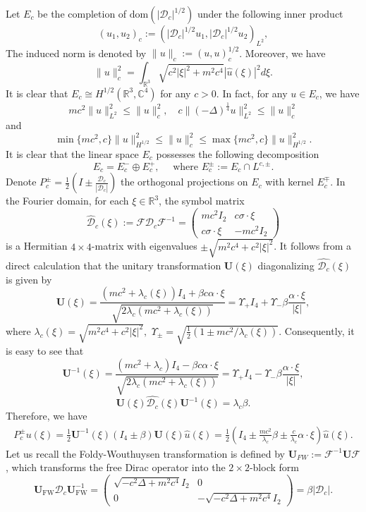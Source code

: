 \documentclass{amsart}
\theoremstyle{plain}
\theoremstyle{definition}
\theoremstyle{remark}
\numberwithin{equation}{section} \numberwithin{figure}{section}
\begin{document}
Let $E_c$ be the completion of $\text{dom}(|\mathscr{D}_c|^{1/2})$ under the following inner product
$$
(u_1,u_2)_c:= \left(|\mathscr{D}_c|^{1/2}u_1, |\mathscr{D}_c|^{1/2}u_2\right)_{L^2},
$$
The induced norm is denoted by $\| u\|_c:=(u,u)_c^{1/2}$. 
Moreover, we have
$$
\|u\|_c^2 = \int_{\mathbb{R}^3}\sqrt{c^2|\xi|^2 + m^2c^4}|\hat{u}(\xi)|^2 d\xi.
$$
It is clear that $E_c\cong H^{1/2}(\mathbb{R}^3,\mathbb{C}^{4})$ for any $c>0$. In fact, for any $u\in E_c$, we have 
$$
mc^2\|u\|_{L^2}^2\leq \| u\|_c^2, \quad c\|(-\Delta)^{\frac{1}{4}}u\|_{L^2}^2\leq \|u\|_c^2
$$
and
\[\min\{mc^2,c\}\|u\|_{H^{1/2}}^2  \leq  \| u\|_c^2\leq \max\{mc^2,c\}\|u\|_{H^{1/2}}^2 .\]
It is clear that the linear space $E_c$ possesses the following decomposition
$$
E_c=E_c^{-} \oplus E_c^{+}, \quad \text { where } E_c^{\pm}:=E_c \cap L^{c, \pm}.
$$
Denote $P_c^\pm=\frac{1}{2}\left(I \pm \frac{\mathscr{D}_c}{\left|\mathscr{D}_c\right|}\right)$ the orthogonal projections on $E_c$ with kernel $E_c^\mp$. 
In the Fourier domain, for each $\xi \in \mathbb{R}^3$, the symbol matrix
$$
\hat{\mathscr{D}}_c(\xi):=   \mathcal{F} \mathscr{D}_c \mathcal{F}^{-1} =\left(\begin{array}{cc}
m c^2 I_2 & c \sigma \cdot \xi \\
c \sigma \cdot \xi & -m c^2 I_2
\end{array}\right)
$$
  is a Hermitian $4\times 4$-matrix with eigenvalues
$\pm \sqrt{m^2 c^4+c^2|\xi|^2}$.
It follows from a direct calculation that the unitary transformation $\mathbf{U}(\xi)$  diagonalizing $\hat{\mathscr{D}_c}(\xi)$
is given  by
$$
\mathbf{U}(\xi)=\frac{\left(m c^2+\lambda_c(\xi)\right) I_4+\beta c \alpha \cdot \xi}{\sqrt{2 \lambda_c\left(m c^2+\lambda_c(\xi)\right)}}=\Upsilon_{+} I_4+\Upsilon_{-} \beta \frac{\alpha \cdot \xi}{|\xi|},
$$
where $\lambda_c(\xi)=\sqrt{m^2 c^4+c^2|\xi|^2}, $ $\Upsilon_{\pm}=\sqrt{\frac{1}{2}\left(1 \pm m c^2 / \lambda_c(\xi)\right)}$.
Consequently, it is easy to see that
$$
\mathbf{U}^{-1}(\xi)=\frac{\left(m c^2+\lambda_c\right) I_4-\beta c \alpha \cdot \xi}{\sqrt{2 \lambda_c\left(m c^2+\lambda_c(\xi)\right)}}=\Upsilon_{+} I_4-\Upsilon_{-} \beta \frac{\alpha \cdot \xi}{|\xi|},
$$
$$
\mathbf{U}(\xi) \hat{\mathscr{D}_c}(\xi) \mathbf{U}^{-1}(\xi)=\lambda_c \beta.
$$
Therefore, we have 
\begin{align}\label{proj}
\widehat{P_c^{\pm}u}(\xi)
=\frac{1}{2}\mathbf{U}^{-1}(\xi)(I_4\pm \beta)\mathbf{U}(\xi)\hat{u}(\xi)=\frac{1}{2}\left(I_4\pm\frac{mc^2}{\lambda_c}\beta\pm\frac{c}{\lambda_c}\alpha\cdot \xi\right)\hat{u}(\xi).
\end{align}
Let us recall  the Foldy-Wouthuysen transformation is defined by $\mathbf{U}_{FW}:= \mathcal{F}^{-1}\mathbf{U}\mathcal{F}$,  which transforms
the free Dirac operator into the $2\times 2$-block form
$$
\mathbf{U}_{\mathrm{FW}} \mathscr{D}_c \mathbf{U}_{\mathrm{FW}}^{-1}=\left(\begin{array}{cc}
\sqrt{-c^2 \Delta+m^2 c^4}I_2 & 0 \\
0 & -\sqrt{-c^2 \Delta+m^2 c^4}I_2
\end{array}\right)=\beta\left|\mathscr{D}_c\right| .
$$
\end{document}
